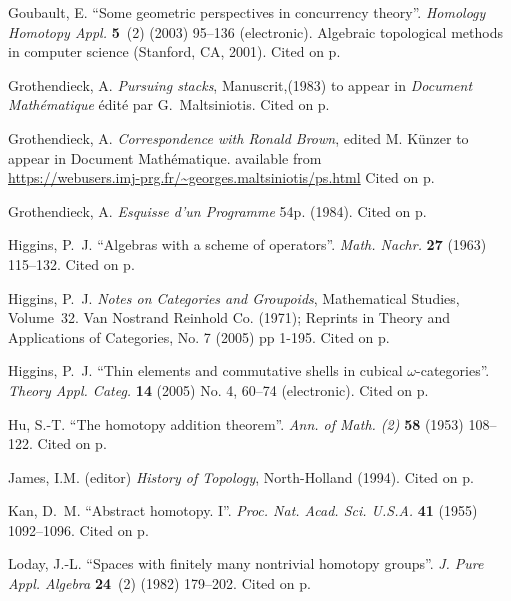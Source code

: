 \documentclass{elsarticle}
\begin{document}
\begin{thebibliography}{MLW50}
Goubault, E.
\newblock \enquote{Some geometric perspectives in concurrency theory}.
\newblock \emph{Homology Homotopy Appl.} \textbf{5}~(2) (2003) 95--136
  (electronic).
\newblock Algebraic topological methods in computer science (Stanford, CA,
  2001).  Cited on p.


Grothendieck, A.
\newblock \emph{Pursuing stacks}, Manuscrit,(1983)
to appear in \emph{Document Math\'ematique}  \'edit\'e par
  G.~Maltsiniotis.  Cited on p.

Grothendieck, A.
\newblock \emph{Correspondence with Ronald Brown},  edited M. K\"unzer to appear in
Document Math\'ematique. available from \\
\url{https://webusers.imj-prg.fr/~georges.maltsiniotis/ps.html}  Cited on p.

Grothendieck, A.
\newblock \emph{Esquisse d'un Programme} 54p. (1984). Cited on p.





Higgins, P.~J.
\newblock \enquote{Algebras with a scheme of operators}.
\newblock \emph{Math. Nachr.} \textbf{27} (1963) 115--132.  Cited on p.

Higgins, P.~J.
\newblock \emph{Notes on Categories and Groupoids}, {Mathematical
  Studies}, Volume~32.
\newblock Van Nostrand Reinhold Co. (1971); Reprints in Theory and Applications of
  Categories, No. 7 (2005) pp 1-195.  Cited on p.

Higgins, P.~J.
\newblock \enquote{Thin elements and commutative shells in cubical
  {$\omega$}-categories}.
\newblock \emph{Theory Appl. Categ.} \textbf{14} (2005) No. 4, 60--74
  (electronic).  Cited on p.

Hu, S.-T.
\newblock \enquote{The homotopy addition theorem}.
\newblock \emph{Ann. of Math. (2)} \textbf{58} (1953) 108--122.  Cited on p.

 James, I.M. (editor)
 \newblock \emph{History of {T}opology}, North-Holland (1994).  Cited on p.

Kan, D.~M.
\newblock \enquote{Abstract homotopy. {I}}.
\newblock \emph{Proc. Nat. Acad. Sci. U.S.A.} \textbf{41} (1955) 1092--1096.  Cited on p.

Loday, J.-L.
\newblock \enquote{Spaces with finitely many nontrivial homotopy groups}.
\newblock \emph{J. Pure Appl. Algebra} \textbf{24}~(2) (1982) 179--202.  Cited on p.


\end{thebibliography}
\end{document}
